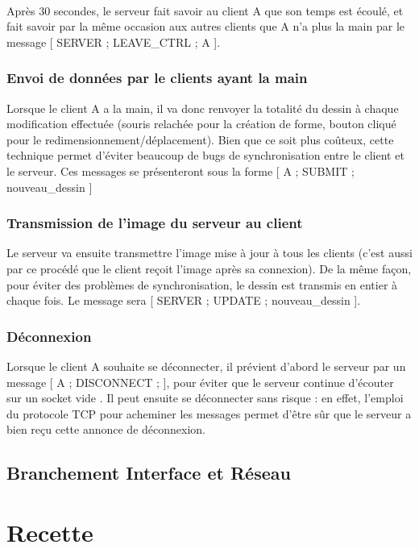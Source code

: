 \documentclass[a4paper,11pt]{article}
\begin{document}
\paragraph{} Après 30 secondes, le serveur fait savoir au client A que son temps est écoulé, et fait savoir par la même occasion aux autres clients que A n'a plus la main par le message [ SERVER ; LEAVE\_CTRL ; A ].

\subsubsection{Envoi de données par le clients ayant la main}
Lorsque le client A a la main, il va donc renvoyer la totalité du dessin à chaque modification effectuée (souris relachée pour la création de forme, bouton cliqué pour le redimensionnement/déplacement). Bien que ce soit plus coûteux, cette technique permet d'éviter beaucoup de bugs de synchronisation entre le client et le serveur. Ces messages se présenteront sous la forme [ A ; SUBMIT ; nouveau\_dessin ]

\subsubsection{Transmission de l'image du serveur au client}
Le serveur va ensuite transmettre l'image mise à jour à tous les clients (c'est aussi par ce procédé que le client reçoit l'image après sa connexion). De la même façon, pour éviter des problèmes de synchronisation, le dessin est transmis en entier à chaque fois. Le message sera [ SERVER ; UPDATE ; nouveau\_dessin ].

\subsubsection{Déconnexion}
Lorsque le client A souhaite se déconnecter, il prévient d'abord le serveur par un message [ A ; DISCONNECT ; ], pour éviter que le serveur continue d'écouter sur un socket \og vide \fg. Il peut ensuite se déconnecter sans risque : en effet, l'emploi du protocole TCP pour acheminer les messages permet d'être sûr que le serveur a bien reçu cette annonce de déconnexion.

\subsection{Branchement Interface et Réseau}


\section{Recette}
\end{document}
